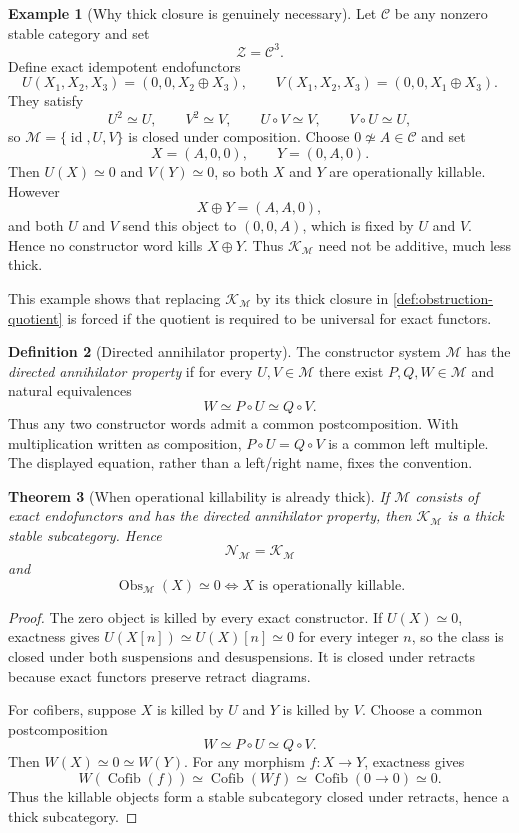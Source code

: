 \documentclass[11pt]{article}
\newtheorem{theorem}{Theorem}[section]
\theoremstyle{definition}
\newtheorem{definition}[theorem]{Definition}
\newtheorem{example}[theorem]{Example}
\theoremstyle{remark}
\newcommand{\Cofib}{\operatorname{Cofib}}
\newcommand{\Obs}{\operatorname{Obs}}
\newcommand{\id}{\operatorname{id}}
\begin{document}
\begin{example}[Why thick closure is genuinely necessary]\label{ex:killable-not-thick}
Let $\mathcal C$ be any nonzero stable category and set
\[
\mathcal Z=\mathcal C^3.
\]
Define exact idempotent endofunctors
\[
U(X_1,X_2,X_3)=(0,0,X_2\oplus X_3),
\qquad
V(X_1,X_2,X_3)=(0,0,X_1\oplus X_3).
\]
They satisfy
\[
U^2\simeq U,
\qquad
V^2\simeq V,
\qquad
U\circ V\simeq V,
\qquad
V\circ U\simeq U,
\]
so $\mathscr M=\{\id,U,V\}$ is closed under composition. Choose $0\not\simeq A\in\mathcal C$ and set
\[
X=(A,0,0),
\qquad
Y=(0,A,0).
\]
Then $U(X)\simeq0$ and $V(Y)\simeq0$, so both $X$ and $Y$ are operationally killable. However
\[
X\oplus Y=(A,A,0),
\]
and both $U$ and $V$ send this object to $(0,0,A)$, which is fixed by $U$ and $V$. Hence no constructor word kills $X\oplus Y$. Thus $\mathcal K_{\mathscr M}$ need not be additive, much less thick.
\end{example}

This example shows that replacing $\mathcal K_{\mathscr M}$ by its thick closure in \cref{def:obstruction-quotient} is forced if the quotient is required to be universal for exact functors.

\begin{definition}[Directed annihilator property]
The constructor system $\mathscr M$ has the \emph{directed annihilator property} if for every $U,V\in\mathscr M$ there exist $P,Q,W\in\mathscr M$ and natural equivalences
\[
W\simeq P\circ U\simeq Q\circ V.
\]
Thus any two constructor words admit a common postcomposition. With multiplication written as composition, $P\circ U=Q\circ V$ is a common left multiple. The displayed equation, rather than a left/right name, fixes the convention.
\end{definition}

\begin{theorem}[When operational killability is already thick]\label{thm:killable-thick}
If $\mathscr M$ consists of exact endofunctors and has the directed annihilator property, then $\mathcal K_{\mathscr M}$ is a thick stable subcategory. Hence
\[
\mathcal N_{\mathscr M}=\mathcal K_{\mathscr M}
\]
and
\[
\boxed{
\Obs_{\mathscr M}(X)\simeq0
\iff
X\text{ is operationally killable}.}
\]
\end{theorem}

\begin{proof}
The zero object is killed by every exact constructor. If $U(X)\simeq0$, exactness gives $U(X[n])\simeq U(X)[n]\simeq0$ for every integer $n$, so the class is closed under both suspensions and desuspensions. It is closed under retracts because exact functors preserve retract diagrams.

For cofibers, suppose $X$ is killed by $U$ and $Y$ is killed by $V$. Choose a common postcomposition
\[
W\simeq P\circ U\simeq Q\circ V.
\]
Then $W(X)\simeq0\simeq W(Y)$. For any morphism $f:X\to Y$, exactness gives
\[
W(\Cofib(f))\simeq\Cofib(Wf)\simeq\Cofib(0\to0)\simeq0.
\]
Thus the killable objects form a stable subcategory closed under retracts, hence a thick subcategory.
\end{proof}
\end{document}

